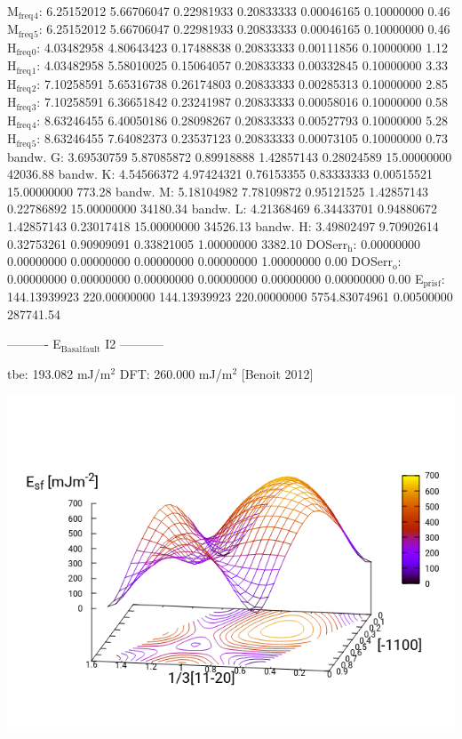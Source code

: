 \documentclass[11pt]{article}
\begin{document}
M\(_{\text{freq}}\)\(_{\text{4}}\):   6.25152012   5.66706047   0.22981933   0.20833333   0.00046165   0.10000000         0.46
M\(_{\text{freq}}\)\(_{\text{5}}\):   6.25152012   5.66706047   0.22981933   0.20833333   0.00046165   0.10000000         0.46
H\(_{\text{freq}}\)\(_{\text{0}}\):   4.03482958   4.80643423   0.17488838   0.20833333   0.00111856   0.10000000         1.12
H\(_{\text{freq}}\)\(_{\text{1}}\):   4.03482958   5.58010025   0.15064057   0.20833333   0.00332845   0.10000000         3.33
H\(_{\text{freq}}\)\(_{\text{2}}\):   7.10258591   5.65316738   0.26174803   0.20833333   0.00285313   0.10000000         2.85
H\(_{\text{freq}}\)\(_{\text{3}}\):   7.10258591   6.36651842   0.23241987   0.20833333   0.00058016   0.10000000         0.58
H\(_{\text{freq}}\)\(_{\text{4}}\):   8.63246455   6.40050186   0.28098267   0.20833333   0.00527793   0.10000000         5.28
H\(_{\text{freq}}\)\(_{\text{5}}\):   8.63246455   7.64082373   0.23537123   0.20833333   0.00073105   0.10000000         0.73
bandw. G:   3.69530759   5.87085872   0.89918888   1.42857143   0.28024589  15.00000000     42036.88
bandw. K:   4.54566372   4.97424321   0.76153355   0.83333333   0.00515521  15.00000000       773.28
bandw. M:   5.18104982   7.78109872   0.95121525   1.42857143   0.22786892  15.00000000     34180.34
bandw. L:   4.21368469   6.34433701   0.94880672   1.42857143   0.23017418  15.00000000     34526.13
bandw. H:   3.49802497   9.70902614   0.32753261   0.90909091   0.33821005   1.00000000      3382.10
DOSerr\(_{\text{h}}\):   0.00000000   0.00000000   0.00000000   0.00000000   0.00000000   1.00000000         0.00
DOSerr\(_{\text{o}}\):   0.00000000   0.00000000   0.00000000   0.00000000   0.00000000   0.00000000         0.00
E\(_{\text{pris}}\)\(_{\text{f}}\): 144.13939923 220.00000000 144.13939923 220.00000000 5754.83074961   0.00500000    287741.54



----------     E\(_{\text{Basal}}\)\(_{\text{fault}}\) I2     -----------

tbe:       193.082 mJ/m\(^{\text{2}}\)
DFT:       260.000 mJ/m\(^{\text{2}}\) [Benoit  2012]

\begin{center}
\includegraphics[width=.9\linewidth]{Images/basal_gs_noo_2019-11-04_pris.png}
\end{center}
\end{document}
